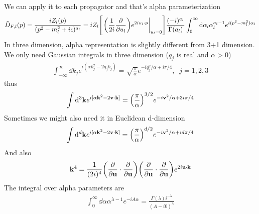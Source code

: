\documentclass[aps,prd,preprint,showkeys,notitlepage,10pt]{revtex4-1}
\newcommand{\vbk}{\vb{k}}
\renewcommand{\a}{\alpha}
\newcommand{\la}{\lambda}
\begin{document}
We can apply it to each propagator and that's alpha parameterization\cite{Smirnov2006}
\begin{align}
	\tilde D_{F,l}(p)=\frac{iZ_l(p)}{(p^2-m_l^2+i\epsilon)^{a_l}}=iZ_l\bqty{\eval{\pqty{\frac{1}{2i}\pdv{u_l}}e^{2iu_l\cdot p}}_{u_l=0}}\frac{(-i)^{a_l}}{\Gamma{(a_l)}}\int_0^{\infty}\dd \a_l \a_l^{a_l-1}e^{i(p^2-m_l^2)\a_l}
	\label{ALPHAPARA}
\end{align}
In three dimension, alpha representation is slightly different from 3+1 dimension. We only need Gaussian integrals in three dimension ($q_j$ is real and $\a>0$)
\begin{align}
	\int_{-\infty}^{\infty}\dd k_je^{i(\a k_j^2-2q_jk_j)}=\sqrt{\frac{\pi}{\a}}e^{-iq_j^2/\a+i\pi/4},\;\;j=1,2,3
\end{align}
thus
\begin{align}
	\int\dd^3\vbk e^{i[\a \vbk^2-2 \vb{v}\cdot \vbk]}=\pqty{\frac{\pi}{\a}}^{3/2}e^{-i\vb{v}^2/\a+3i\pi/4}
\end{align}
Sometimes we might also need it in Euclidean d-dimension
\begin{align}
	\int\dd^d\vbk e^{i[\a \vbk^2-2 \vb{v}\cdot \vbk]}=\pqty{\frac{\pi}{\a}}^{d/2}e^{-i\vb{v}^2/\a+id\pi/4}
\end{align}
And also
\begin{align*}
	\vbk^4=\frac{1}{(2i)^4}\pqty{\pdv{\vb{u}}\cdot\pdv{\vb{u}}}\pqty{\pdv{\vb{u}}\cdot\pdv{\vb{u}}}e^{2i\vb{u}\cdot\vbk}
\end{align*}
The integral over alpha parameters are
\begin{align*}
	\int_0^{\infty}\dd \a \a^{\la-1}e^{-i A \a}=\frac{\Gamma(\la)i^{-\la}}{(A-i0)^{\la}}
\end{align*}
\end{document}
